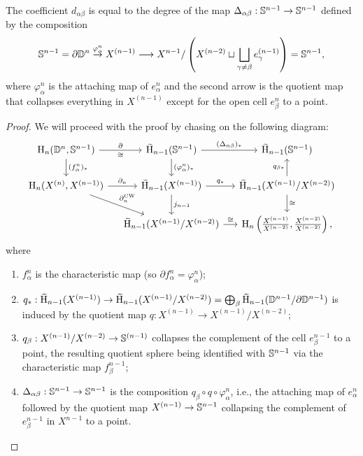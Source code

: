 \begin{thm}
    The coefficient $d_{\alpha\beta}$ is equal to the degree of the map $\Delta_{\alpha\beta}:\mathbb{S}^{n-1}\to \mathbb{S}^{n-1}$ defined by the composition
    \[\mathbb{S}^{n-1}=\partial \mathbb{D}^n\overset{\varphi_\alpha^n}{\to}X^{(n-1)}\longrightarrow X^{n-1}\slash\left(X^{(n-2)}\sqcup \bigsqcup_{\gamma\neq\beta}e_\gamma^{(n-1)}\right)=\mathbb{S}^{n-1},\]
    where $\varphi_\alpha^n$ is the attaching map of $e^n_\alpha$ and the second arrow is the quotient map that collapses everything in $X^{(n-1)}$ except for the open cell $e^n_\beta$ to a point.
\end{thm}
\begin{proof}
    We will proceed with the proof by chasing on the following diagram:
    \[
    \begin{tikzcd}[column sep=small] 
    \rmH_n(\bbD^n,\bbS^{n-1})\arrow[r,"\partial","\cong"']\arrow[d,"(f^n_\alpha)_\ast"]& \wt{\rmH}_{n-1}(\bbS^{n-1})\arrow[r,"(\Delta_{\alpha\beta})_\ast"]\arrow[d,"(\varphi^n_\alpha)_\ast"]& \wt{\rmH}_{n-1}(\bbS^{n-1})\\
    \rmH_n(X^{(n)},X^{(n-1)})\arrow[r,"\partial_n"]\arrow[dr,"\partial_n^{\mathrm{CW}}"]& \wt{\rmH}_{n-1}(X^{(n-1)})\arrow[r,"q_\ast"]\arrow[d,"j_{n-1}"]&\wt{\rmH}_{n-1}(X^{(n-1)}\slash X^{(n-2)})\arrow[d,"\cong"]\arrow[u,"q_{\beta\ast}"]\\
    & \wt{\rmH}_{n-1}(X^{(n-1)}\slash X^{(n-2)})\arrow[r,"\cong"]& \rmH_n\left(\frac{X^{(n-1)}}{X^{(n-2)}},\frac{X^{(n-2)}}{X^{(n-2)}}\right),
    \end{tikzcd}
    \]
    where 
    \begin{enumerate}
         \item $f_\alpha^n$ is the characteristic map (so $\partial f_\alpha^n=\varphi_\alpha^n$); 
         \item $q_\ast:\wt{\rmH}_{n-1}(X^{(n-1)})\to \wt{\rmH}_{n-1}(X^{(n-1)}\slash X^{(n-2)})=\bigoplus_\beta \wt{\rmH}_{n-1}(\bbD^{n-1}\slash \partial \bbD^{n-1})$ is induced by the quotient map $q:X^{(n-1)}\to X^{(n-1)}\slash X^{(n-2)}$; 
         \item $q_\beta:X^{(n-1)}\slash X^{(n-2)}\to \mathbb{S}^{(n-1)}$ collapses the complement of the cell $e^{n-1}_\beta$ to a point, the resulting quotient sphere being identified with $\mathbb{S}^{n-1}$ via the characteristic map $f^{n-1}_\beta$;
         \item $\Delta_{\alpha\beta}:\mathbb{S}^{n-1}\to \mathbb{S}^{n-1}$ is the composition $q_\beta\circ q\circ \varphi^n_\alpha$, i.e., the attaching map of $e^n_\alpha$ followed by the quotient map $X^{(n-1)}\to \mathbb{S}^{n-1}$ collapsing the complement of $e^{n-1}_\beta$ in $X^{n-1}$ to a point.

\end{enumerate}
\end{proof}
